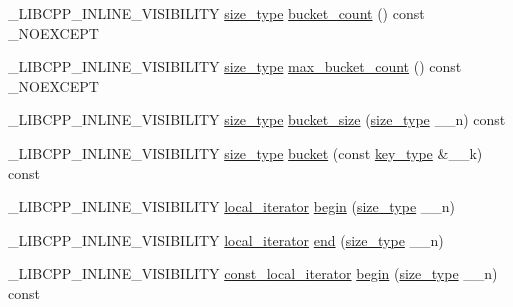 \begin{DoxyCompactItemize}
\item 
\+\_\+\+L\+I\+B\+C\+P\+P\+\_\+\+I\+N\+L\+I\+N\+E\+\_\+\+V\+I\+S\+I\+B\+I\+L\+I\+T\+Y \hyperlink{classunordered__multimap_a977c4093df6d4d0302f280de19af4b58}{size\+\_\+type} \hyperlink{classunordered__multimap_a9131f5533a74340a675344de1ceb782d}{bucket\+\_\+count} () const \+\_\+\+N\+O\+E\+X\+C\+E\+P\+T
\item 
\+\_\+\+L\+I\+B\+C\+P\+P\+\_\+\+I\+N\+L\+I\+N\+E\+\_\+\+V\+I\+S\+I\+B\+I\+L\+I\+T\+Y \hyperlink{classunordered__multimap_a977c4093df6d4d0302f280de19af4b58}{size\+\_\+type} \hyperlink{classunordered__multimap_aa184d428f77dca5deb39a49d9e73d0fb}{max\+\_\+bucket\+\_\+count} () const \+\_\+\+N\+O\+E\+X\+C\+E\+P\+T
\item 
\+\_\+\+L\+I\+B\+C\+P\+P\+\_\+\+I\+N\+L\+I\+N\+E\+\_\+\+V\+I\+S\+I\+B\+I\+L\+I\+T\+Y \hyperlink{classunordered__multimap_a977c4093df6d4d0302f280de19af4b58}{size\+\_\+type} \hyperlink{classunordered__multimap_a2f17283316f81107b947d65a9f413302}{bucket\+\_\+size} (\hyperlink{classunordered__multimap_a977c4093df6d4d0302f280de19af4b58}{size\+\_\+type} \+\_\+\+\_\+n) const 
\item 
\+\_\+\+L\+I\+B\+C\+P\+P\+\_\+\+I\+N\+L\+I\+N\+E\+\_\+\+V\+I\+S\+I\+B\+I\+L\+I\+T\+Y \hyperlink{classunordered__multimap_a977c4093df6d4d0302f280de19af4b58}{size\+\_\+type} \hyperlink{classunordered__multimap_af0a37a1ef16ed0295c3c88e3db6a3f82}{bucket} (const \hyperlink{classunordered__multimap_a2902747087a03531493d30e9840f67d9}{key\+\_\+type} \&\+\_\+\+\_\+k) const 
\item 
\+\_\+\+L\+I\+B\+C\+P\+P\+\_\+\+I\+N\+L\+I\+N\+E\+\_\+\+V\+I\+S\+I\+B\+I\+L\+I\+T\+Y \hyperlink{classunordered__multimap_a672fd63d94f807d130e2026d2863d40c}{local\+\_\+iterator} \hyperlink{classunordered__multimap_adcf1c56592b5024badda959710468e58}{begin} (\hyperlink{classunordered__multimap_a977c4093df6d4d0302f280de19af4b58}{size\+\_\+type} \+\_\+\+\_\+n)
\item 
\+\_\+\+L\+I\+B\+C\+P\+P\+\_\+\+I\+N\+L\+I\+N\+E\+\_\+\+V\+I\+S\+I\+B\+I\+L\+I\+T\+Y \hyperlink{classunordered__multimap_a672fd63d94f807d130e2026d2863d40c}{local\+\_\+iterator} \hyperlink{classunordered__multimap_a6bd63b6d5f0158c7dc9c3becc642a0fc}{end} (\hyperlink{classunordered__multimap_a977c4093df6d4d0302f280de19af4b58}{size\+\_\+type} \+\_\+\+\_\+n)
\item 
\+\_\+\+L\+I\+B\+C\+P\+P\+\_\+\+I\+N\+L\+I\+N\+E\+\_\+\+V\+I\+S\+I\+B\+I\+L\+I\+T\+Y \hyperlink{classunordered__multimap_a4813834c894681f449b5afe718336482}{const\+\_\+local\+\_\+iterator} \hyperlink{classunordered__multimap_aeb2b39ffb1de46c6dffd2c525943906d}{begin} (\hyperlink{classunordered__multimap_a977c4093df6d4d0302f280de19af4b58}{size\+\_\+type} \+\_\+\+\_\+n) const 

\end{DoxyCompactItemize}
